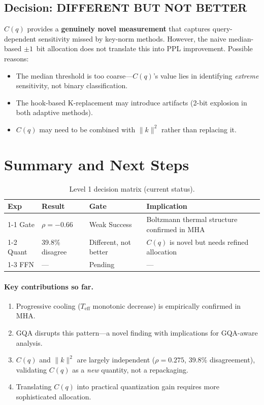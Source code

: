 \documentclass[11pt,a4paper]{article}
\begin{document}
\subsection{Decision: \textcolor{partial}{DIFFERENT BUT NOT BETTER}}

$C(q)$ provides a \textbf{genuinely novel measurement} that captures query-dependent sensitivity missed by key-norm methods.
However, the naive median-based $\pm1$~bit allocation does not translate this into PPL improvement.
Possible reasons:
\begin{itemize}[nosep]
  \item The median threshold is too coarse---$C(q)$'s value lies in identifying \textit{extreme} sensitivity, not binary classification.
  \item The hook-based K-replacement may introduce artifacts (2-bit explosion in both adaptive methods).
  \item $C(q)$ may need to be combined with $\|k\|^2$ rather than replacing it.
\end{itemize}

\section{Summary and Next Steps}

\begin{table}[H]
\centering
\caption{Level 1 decision matrix (current status).}
\begin{tabularx}{\textwidth}{lll>{\raggedright\arraybackslash}X}
\toprule
\textbf{Exp} & \textbf{Result} & \textbf{Gate} & \textbf{Implication} \\
\midrule
1-1 Gate & $\rho=-0.66$ & \textcolor{partial}{Weak Success} & Boltzmann thermal structure confirmed in MHA \\
1-2 Quant & 39.8\% disagree & \textcolor{partial}{Different, not better} & $C(q)$ is novel but needs refined allocation \\
1-3 FFN & --- & Pending & --- \\
\bottomrule
\end{tabularx}
\end{table}

\paragraph{Key contributions so far.}
\begin{enumerate}[nosep]
  \item Progressive cooling ($T_\mathrm{eff}$ monotonic decrease) is empirically confirmed in MHA.
  \item GQA disrupts this pattern---a novel finding with implications for GQA-aware analysis.
  \item $C(q)$ and $\|k\|^2$ are largely independent ($\rho=0.275$, 39.8\% disagreement), validating $C(q)$ as a \textit{new} quantity, not a repackaging.
  \item Translating $C(q)$ into practical quantization gain requires more sophisticated allocation.
\end{enumerate}
\end{document}
